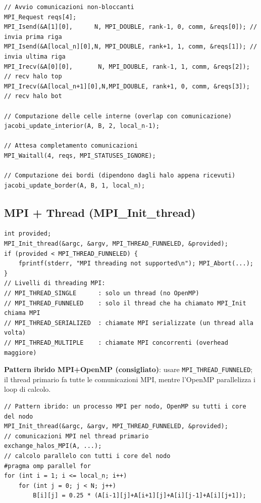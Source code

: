 \documentclass[11pt,a4paper]{article}
\theoremstyle{remark}
\begin{document}
\begin{lstlisting}[style=cpp]
// Avvio comunicazioni non-bloccanti
MPI_Request reqs[4];
MPI_Isend(&A[1][0],      N, MPI_DOUBLE, rank-1, 0, comm, &reqs[0]); // invia prima riga
MPI_Isend(&A[local_n][0],N, MPI_DOUBLE, rank+1, 1, comm, &reqs[1]); // invia ultima riga
MPI_Irecv(&A[0][0],       N, MPI_DOUBLE, rank-1, 1, comm, &reqs[2]); // recv halo top
MPI_Irecv(&A[local_n+1][0],N,MPI_DOUBLE, rank+1, 0, comm, &reqs[3]); // recv halo bot

// Computazione delle celle interne (overlap con comunicazione)
jacobi_update_interior(A, B, 2, local_n-1);

// Attesa completamento comunicazioni
MPI_Waitall(4, reqs, MPI_STATUSES_IGNORE);

// Computazione dei bordi (dipendono dagli halo appena ricevuti)
jacobi_update_border(A, B, 1, local_n);
\end{lstlisting}

\subsection{MPI + Thread (MPI\_Init\_thread)}

\begin{lstlisting}[style=cpp]
int provided;
MPI_Init_thread(&argc, &argv, MPI_THREAD_FUNNELED, &provided);
if (provided < MPI_THREAD_FUNNELED) {
    fprintf(stderr, "MPI threading not supported\n"); MPI_Abort(...);
}
// Livelli di threading MPI:
// MPI_THREAD_SINGLE      : solo un thread (no OpenMP)
// MPI_THREAD_FUNNELED    : solo il thread che ha chiamato MPI_Init chiama MPI
// MPI_THREAD_SERIALIZED  : chiamate MPI serializzate (un thread alla volta)
// MPI_THREAD_MULTIPLE    : chiamate MPI concorrenti (overhead maggiore)
\end{lstlisting}

\textbf{Pattern ibrido MPI+OpenMP (consigliato)}: usare \lstinline|MPI_THREAD_FUNNELED|; il thread primario fa tutte le comunicazioni MPI, mentre l'OpenMP parallelizza i loop di calcolo.

\begin{lstlisting}[style=cpp]
// Pattern ibrido: un processo MPI per nodo, OpenMP su tutti i core del nodo
MPI_Init_thread(&argc, &argv, MPI_THREAD_FUNNELED, &provided);
// comunicazioni MPI nel thread primario
exchange_halos_MPI(A, ...);
// calcolo parallelo con tutti i core del nodo
#pragma omp parallel for
for (int i = 1; i <= local_n; i++)
    for (int j = 0; j < N; j++)
        B[i][j] = 0.25 * (A[i-1][j]+A[i+1][j]+A[i][j-1]+A[i][j+1]);
\end{lstlisting}
\end{document}
